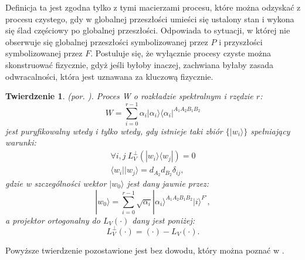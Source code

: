 \documentclass[10pt]{article} %
\newtheorem{tw}{Twierdzenie}
\DeclareMathOperator{\Trs}{Tr}
\newcommand{\Ket}[1]{|#1\rangle}
\newcommand{\Bra}[1]{\langle#1|}
\newcommand{\BBra}[1]{\langle\langle#1|}
\newcommand{\KKet}[1]{|#1\rangle\rangle}
\newcommand{\I}{\mathbb{1}}
\newcommand{\LPV}{{L^\perp_V}}
\begin{document}
Definicja ta jest zgodna tylko z tymi macierzami procesu, które można odzyskać z procesu czystego, gdy w globalnej przeszłości umieści się ustalony stan i wykona się ślad częściowy po globalnej przeszłości. Odpowiada to sytuacji, w której nie obserwuje się globalnej przeszłości symbolizowanej przez $P$ i przyszłości symbolizowanej przez $F$.
Postuluje się, że wyłącznie procesy czyste można skonstruować fizycznie, gdyż jeśli byłoby inaczej, zachwiana byłaby zasada odwracalności, która jest uznawana za kluczową fizycznie. 
\begin{tw}
(por. \cite{purification}).
Proces W o rozkładzie spektralnym i rzędzie $r$:
\begin{equation}
W = \sum_{i=0}^{r-1} \alpha_i \Ket{\alpha_i}\Bra{\alpha_i}^{A_1A_2B_1B_2}
\end{equation}
jest puryfikowalny wtedy i tylko wtedy, gdy istnieje taki zbiór $\{\Ket{w_i}\}$ spełniający warunki:
\begin{gather}
\forall i,j~\LPV(\Ket{w_i}\Bra{w_j}) = 0\\
\Bra{w_i}\Ket{w_j} = d_{A_2}d_{B_2}\delta_{ij},
\end{gather}
gdzie w szczególności wektor $\Ket{w_0}$ jest dany jawnie przez:
\begin{equation}
\label{w0}
\Ket{w_0} = \sum_{i=0}^{r-1} \sqrt{\alpha_i} \Ket{\alpha_i}^{A_1A_2B_1B_2}\Ket{i}^{F'},
\end{equation}
a projektor ortogonalny do $L_V(\cdot)$ dany jest poniżej:
\begin{equation}
\LPV(\cdot) = (\cdot) - L_V(\cdot).
\end{equation}
\end{tw} Powyższe twierdzenie pozostawione jest bez dowodu, który można poznać w \cite{purification}. %
\end{document}
